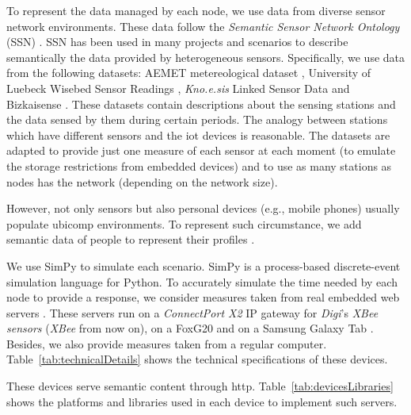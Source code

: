 To represent the data managed by each node, we use data from diverse sensor network environments.
These data follow the \textit{Semantic Sensor Network Ontology} (SSN) .
SSN has been used in many projects and scenarios to describe semantically the data provided by heterogeneous sensors.
Specifically, we use data from the following datasets:
AEMET metereological dataset ,
University of Luebeck Wisebed Sensor Readings ,
\emph{Kno.e.sis} Linked Sensor Data 
and Bizkaisense .
These datasets contain descriptions about the sensing stations and the data sensed by them during certain periods.
The analogy between stations which have different sensors and the \ac{iot} devices is reasonable.
The datasets are adapted to provide just one measure of each sensor at each moment (to emulate the storage restrictions from embedded devices) and to use as many stations as nodes has the network (depending on the network size).

However, not only sensors but also personal devices (e.g., mobile phones) usually populate \ac{ubicomp} environments.
To represent such circumstance, we add semantic data of people to represent their profiles .

We use SimPy  to simulate each scenario.
SimPy is a process-based discrete-event simulation language for Python.
To accurately simulate the time needed by each node to provide a response, we consider measures taken from real embedded web servers \citep{gomez-goiri_restful_2012}.
These servers run on a \textit{ConnectPort X2} IP gateway  for \textit{Digi}'s \textit{XBee sensors}  (\textit{XBee} from now on),
on a FoxG20  and on a Samsung Galaxy Tab .
Besides, we also provide measures taken from a regular computer.
Table~\ref{tab:technicalDetails} shows the technical specifications of these devices.





These devices serve semantic content through \acs{http}.
Table~\ref{tab:devicesLibraries} shows the platforms and libraries used in each device to implement such servers.




